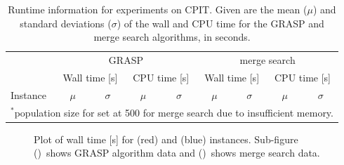 \documentclass[journal]{IEEEtran}
\begin{document}
\begin{table}[h!]
\centering
\caption[Runtime information for experiments on CPIT]{Runtime information for experiments on CPIT. Given are the mean (\(\mu\)) and standard deviations (\(\sigma\)) of the wall and CPU time for the GRASP and merge search algorithms, in seconds.}\label{tab:mine:runtime}
\begin{adjustbox}{width=0.48\textwidth}
\begin{tabular}{lrrrrrrrr} \toprule
 & \multicolumn{4}{c}{GRASP} & \multicolumn{4}{c}{merge search}\\
\cmidrule(lr){2-5} \cmidrule(lr){6-9}
 & \multicolumn{2}{c}{Wall time [s]} & \multicolumn{2}{c}{CPU time [s]} & \multicolumn{2}{c}{Wall time [s]} & \multicolumn{2}{c}{CPU time [s]}\\
\cmidrule(lr){2-3}\cmidrule(lr){4-5} \cmidrule(lr){6-7}\cmidrule(lr){8-9}
Instance & \multicolumn{1}{c}{\(\mu\)}&\multicolumn{1}{c}{\(\sigma\)} & \multicolumn{1}{c}{\(\mu\)}& \multicolumn{1}{c}{\(\sigma\)}& \multicolumn{1}{c}{\(\mu\)}&\multicolumn{1}{c}{\(\sigma\)} & \multicolumn{1}{c}{\(\mu\)}& \multicolumn{1}{c}{\(\sigma\)}\\ \midrule



\bottomrule
\multicolumn{9}{l}{\(^*\)population size for \zucklarge{} set at 500 for merge search due to insufficient memory.}
\end{tabular}
\end{adjustbox}
\end{table}
%
\begin{figure}[h!]
    \centering
    \begin{subfigure}[t]{0.23\textwidth}
    \centering
    \caption{}
    \label{plot:time.1}
    \end{subfigure}
    \quad
    \begin{subfigure}[t]{0.23\textwidth}
    \centering
    \caption{}
    \label{plot:time.2}
    \end{subfigure}
    \caption[Plot of wall time {[s]} for \zucksmall{} and \dmine{} instances]{Plot of wall time [s] for \zucksmall{} (red) and \dmine{} (blue) instances. Sub-figure ()~shows GRASP algorithm data and ()~shows merge search data.}
    \label{plot:mine:time}
\end{figure}
%
\end{document}
